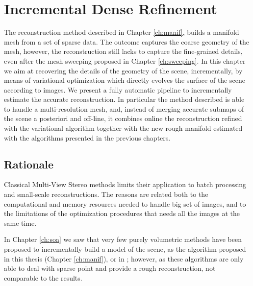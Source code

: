 \chapter[Incremental Dense Refinement]{Incremental Dense Refinement}
\label{ch:incrDenseRef}

The reconstruction method described in Chapter \ref{ch:manif}, builds a manifold mesh from a set of sparse data. 
The outcome captures the coarse geometry of the mesh, however, the reconstruction still lacks to capture the fine-grained details, even after the mesh sweeping proposed in Chapter \ref{ch:sweeping}.
In this chapter we aim at recovering the details of the geometry of the scene, incrementally, by means of variational optimization which directly evolves the surface of the scene according to images. 
We present a fully automatic pipeline to incrementally estimate the accurate reconstruction. 
In particular the method described is able to handle a multi-resolution mesh, and, instead of merging accurate submaps of the scene a posteriori and off-line, it combines online the reconstruction refined with the variational algorithm together with the new rough manifold estimated with the algorithms presented in the previous chapters.

\minitoc
\newpage

\section{Rationale}

Classical Multi-View Stereo methods \cite{gargallo2005bayesian,delaunoy_et_al_08} limits their application to batch processing and small-scale reconstructions.
The reasons are related both to the computational and memory resources needed to handle big set of images, and to the limitations of the optimization procedures that needs all the images at the same time.

In Chapter \ref{ch:soa} we saw that very few purely volumetric methods have been proposed to incrementally build a model of the scene, as the algorithm proposed in this thesis (Chapter \ref{ch:manif}), or in \cite{lovi_et_al_11,hoppe2013incremental,litvinov_lhuillier_13}; however, as these algorithms are  only able to deal with sparse point and provide a rough reconstruction, not comparable to the \mvs results.

